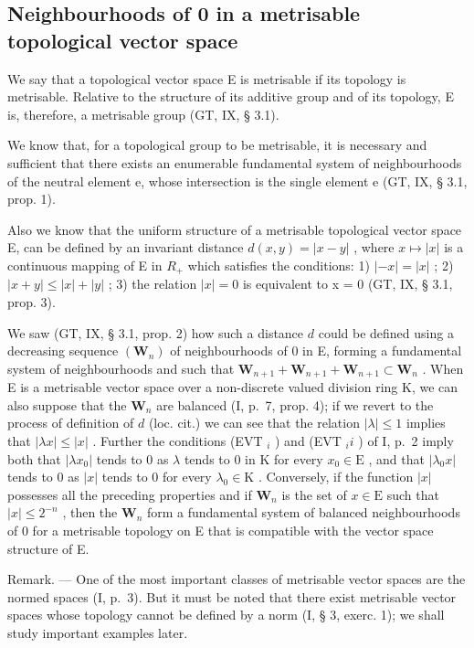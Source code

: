 \subsection{Neighbourhoods of 0 in a metrisable topological vector space}

We say that a topological vector space E is metrisable if its topology is metrisable. Relative to the structure of its additive group and of its topology, E is, therefore, a metrisable group (GT, IX, § 3.1).

We know that, for a topological group to be metrisable, it is necessary and sufficient that there exists an enumerable fundamental system of neighbourhoods of the neutral element e, whose intersection is the single element e (GT, IX, § 3.1, prop. 1).

Also we know that the uniform structure of a metrisable topological vector space E, can be defined by an invariant distance \(d(x, y) = |x - y|\) , where \(x \mapsto |x|\) is a continuous mapping of E in \(R_{+}\) which satisfies the conditions: 1) \(|-x| = |x|\) ; 2) \(|x + y| \leqslant |x| + |y|\) ; 3) the relation \(|x| = 0\) is equivalent to x = 0 (GT, IX, § 3.1, prop. 3).

We saw (GT, IX, § 3.1, prop. 2) how such a distance \(d\) could be defined using a decreasing sequence \((\mathbf{W}_n)\) of neighbourhoods of 0 in E, forming a fundamental system of neighbourhoods and such that \(\mathbf{W}_{n+1} + \mathbf{W}_{n+1} + \mathbf{W}_{n+1} \subset \mathbf{W}_n\) . When E is a metrisable vector space over a non-discrete valued division ring K, we can also suppose that the \(\mathbf{W}_n\) are balanced (I, p.~7, prop. 4); if we revert to the process of definition of \(d\) (loc. cit.) we can see that the relation \(|\lambda| \leqslant 1\) implies that \(|\lambda x| \leqslant |x|\) . Further the conditions (EVT \(_i\) ) and (EVT \(_ii\) ) of I, p.~2 imply both that \(|\lambda x_0|\) tends to 0 as \(\lambda\) tends to 0 in K for every \(x_0 \in \mathrm{E}\) , and that \(|\lambda_0 x|\) tends to 0 as \(|x|\) tends to 0 for every \(\lambda_0 \in \mathrm{K}\) . Conversely, if the function \(|x|\) possesses all the preceding properties and if \(\mathbf{W}_n\) is the set of \(x \in \mathrm{E}\) such that \(|x| \leqslant 2^{-n}\) , then the \(\mathbf{W}_n\) form a fundamental system of balanced neighbourhoods of 0 for a metrisable topology on E that is compatible with the vector space structure of E.

Remark. --- One of the most important classes of metrisable vector spaces are the normed spaces (I, p.~3). But it must be noted that there exist metrisable vector spaces whose topology cannot be defined by a norm (I, § 3, exerc. 1); we shall study important examples later.

